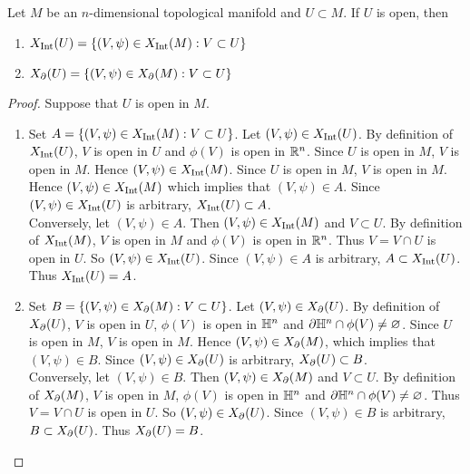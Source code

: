 \documentclass{book}
\begin{document}
	\begin{ex}
		Let $M$ be an $n$-dimensional topological manifold and $U \subset M$. If $U$ is open, then 
		\begin{enumerate}
			\item $X_{\operatorname{Int}}(U) = \{(V, \psi) \in X_{\operatorname{Int}}(M): V \subset U\}$
			\item $X_{\partial}(U) = \{(V, \psi) \in X_{\partial}(M): V \subset U\}$
		\end{enumerate}
	\end{ex}
	
	\begin{proof}
		Suppose that $U$ is open in $M$.
		\begin{enumerate}
			\item Set $A = \{(V, \psi) \in X_{\operatorname{Int}}(M): V \subset U\}$. Let $(V, \psi) \in X_{\operatorname{Int}}(U)$. By definition of $X_{\operatorname{Int}}(U)$, $V$ is open in $U$ and $\phi(V)$ is open in $\mathbb{R}^n$. Since $U$ is open in $M$, $V$ is open in $M$. Hence $(V, \psi) \in X_{\operatorname{Int}}(M)$. Since $U$ is open in $M$, $V$ is open in $M$. Hence $(V, \psi) \in X_{\operatorname{Int}}(M)$ which implies that $(V, \psi) \in A$. Since $(V, \psi) \in X_{\operatorname{Int}}(U)$ is arbitrary, $X_{\operatorname{Int}}(U) \subset A$. \\
			Conversely, let $(V, \psi) \in A$. Then $(V, \psi) \in X_{\operatorname{Int}}(M)$ and $V \subset U$. By definition of $X_{\operatorname{Int}}(M)$, $V$ is open in $M$ and $\phi(V)$ is open in $\mathbb{R}^n$. Thus $V = V \cap U$ is open in $U$. So $(V, \psi) \in X_{\operatorname{Int}}(U)$. Since $(V, \psi) \in A$ is arbitrary, $A \subset X_{\operatorname{Int}}(U)$. Thus $X_{\operatorname{Int}}(U) = A$.
			
			\item Set $B = \{(V, \psi) \in X_{\partial}(M): V \subset U\}$. Let $(V, \psi) \in X_{\partial}(U)$. By definition of $X_{\partial}(U)$, $V$ is open in $U$, $\phi(V)$ is open in $\mathbb{H}^n$ and $\partial \mathbb{H}^n \cap \phi(V) \neq \varnothing$. Since $U$ is open in $M$, $V$ is open in $M$. Hence $(V, \psi) \in X_{\partial}(M)$, which implies that $(V, \psi) \in B$. Since $(V, \psi) \in X_{\partial}(U)$ is arbitrary, $X_{\partial}(U) \subset B$. \\
			Conversely, let $(V, \psi) \in B$. Then $(V, \psi) \in X_{\partial}(M)$ and $V \subset U$. By definition of $X_{\partial}(M)$, $V$ is open in $M$, $\phi(V)$ is open in $\mathbb{H}^n$ and $\partial \mathbb{H}^n \cap \phi(V) \neq \varnothing$. Thus $V = V \cap U$ is open in $U$. So $(V, \psi) \in X_{\partial}(U)$. Since $(V, \psi) \in B$ is arbitrary, $B \subset X_{\partial}(U)$. Thus $X_{\partial}(U) = B$.
		\end{enumerate}
	\end{proof}
	
\end{document}
